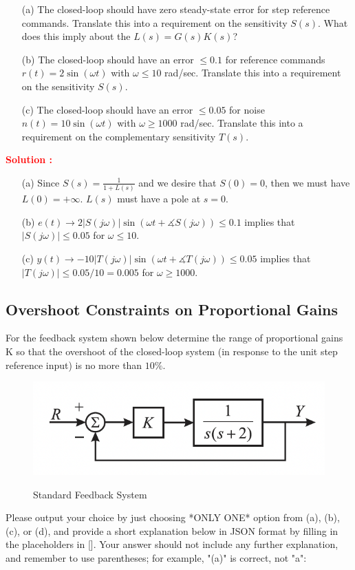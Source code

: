 \documentclass[12pt]{article}
\begin{document}
\begin{itemize}
    \item[(a)] The closed-loop should have zero steady-state error for step reference commands. Translate this into a requirement on the sensitivity $S(s)$. What does this imply about the $L(s)=G(s)K(s)$?
    \item[(b)] The closed-loop should have an error $\leq 0.1$ for reference commands $r(t) = 2\sin(\omega t)$ with $\omega \leq 10$ rad/sec. Translate this into a requirement on the sensitivity $S(s)$.
    \item[(c)] The closed-loop should have an error $\leq 0.05$ for noise $n(t)=10\sin(\omega t)$ with $\omega \geq 1000$ rad/sec. Translate this into a requirement on the complementary sensitivity $T(s)$. 
\end{itemize}

\textbf{\textcolor{red}{Solution :}}

\begin{itemize}
    \item[(a)] Since $S(s) = \frac{1}{1+L(s)}$ and we desire that $S(0)=0$, then we must have $L(0) = +\infty$. $L(s)$ must have a pole at $s=0$.
    \item[(b)] $e(t) \rightarrow 2 |S(j \omega)| \sin(\omega t + \measuredangle S(j \omega)) \leq 0.1$ implies that $|S(j \omega)| \leq 0.05$ for $\omega \leq 10$.
    \item[(c)] $y(t) \rightarrow - 10 |T(j \omega)| \sin(\omega t + \measuredangle T(j\omega)) \leq 0.05$ implies that $|T(j \omega)| \leq 0.05/10 = 0.005$ for $\omega \geq 1000$.
\end{itemize}
\clearpage

\subsection{Overshoot Constraints on Proportional Gains}
For the feedback system shown below determine the range of proportional gains K so that the overshoot of the closed-loop system (in response to the unit step reference input) is no more than $10\%$. \\

\begin{figure}[h!]
    \centering
    \includegraphics[width=0.8\linewidth]{figs/4.3.png}
    \label{fig:prb36}
    \caption{Standard Feedback System}
\end{figure}
Please output your choice by just choosing *ONLY ONE* option from (a), (b), (c), or (d), and provide a short explanation below in JSON format by filling in the placeholders in []. Your answer should not include any further explanation, and remember to use parentheses; for example, "(a)" is correct, not "a":
\end{document}
